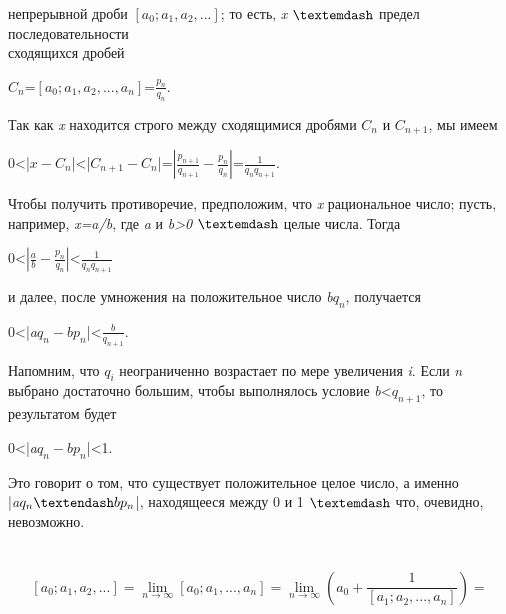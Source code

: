 \documentclass[a4paper,12pt]{article}
\begin{document}
	непрерывной дроби $[a_0; a_1, a_2, ...]$; то есть, \textit{x} $\textemdash$ предел последовательности\\
	сходящихся дробей\\
	\begin{center} $C_n$=$[a_0; a_1, a_2, ..., a_n]$=$\frac{p_n}{q_n}$. \end{center}
	Так как \textit{x} находится строго между сходящимися дробями $C_n$ и $C_{n+1}$, мы имеем\\
	\begin{center} 0<|$\textit{x}-C_n$|<|$C_{n+1}-C_n$|=$\left| \frac{p_{n+1}}{q_{n+1}}-\frac{p_n}{q_n} \right|$=$\frac{1}{q_{n}q_{n+1}}$. \end{center}
	Чтобы получить противоречие, предположим, что \textit{x} рациональное число; пусть, например, \textit{x=a/b}, где \textit{a} и \textit{b>0} $\textemdash$ целые числа. Тогда\\
	\begin{center} 0<$\left|\frac{a}{b}-\frac{p_n}{q_n}\right|$<$\frac{1}{q_{n}q_{n+1}}$ \end{center}
	и далее, после умножения на положительное число \textit{b$q_n$}, получается\\
	\begin{center} 0<|\textit{a$q_n-bp_n$}|<$\frac{b}{q_{n+1}}$. \end{center}
	Напомним, что $q_i$ неограниченно возрастает по мере увеличения \textit{i}. Если \textit{n}\\
	выбрано достаточно большим, чтобы выполнялось условие \textit{b}<$q_{n+1}$, то \\
	результатом будет\\
	\begin{center} 0<|\textit{a$q_n-bp_n$}|<1. \end{center}
	Это говорит о том, что существует положительное целое число, а именно\\
	|\textit{a$q_n \textendash bp_n$}|, находящееся между 0 и 1 $\textemdash$ что, очевидно, невозможно.\\\\
	\\
	$$[a_0; a_1, a_2, ...]=\lim_{n\to\infty} [a_0; a_1, ..., a_n]=\lim_{n\to\infty} \left(a_0+\frac{1}{[a_1; a_2, ..., a_n]}\right)=$$\\
\end{document}
